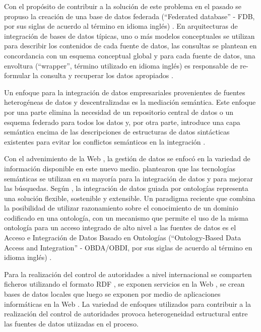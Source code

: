 Con el propósito de contribuir a la solución de este problema en el pasado se propuso la creación de una base de datos federada (``Federated database'' - FDB, por sus siglas de acuerdo al término en idioma inglés) \citep{Sheth1990}. En arquitecturas de integración de bases de datos típicas, uno o más modelos conceptuales se utilizan para describir los contenidos de cada fuente de datos, las consultas se plantean en concordancia con un esquema conceptual global y para cada fuente de datos, una envoltura (``wrapper'', término utilizado en idioma inglés) es responsable de re-formular la consulta y recuperar los datos apropiados \citep{Spanos2012,Franke2014,ElKadiri2015}.

Un enfoque para la integración de datos empresariales provenientes de fuentes heterogéneas de datos y descentralizadas es la mediación semántica. Este enfoque por una parte elimina la necesidad de un repositorio central de datos o un esquema federado para todos los datos y, por otra parte, introduce una capa semántica encima de las descripciones de estructuras de datos sintácticas existentes para evitar los conflictos semánticos en la integración \citep{ElKadiri2015}. 

Con el advenimiento de la Web \citep{berners1990worldwideweb}, la gestión de datos se enfocó en la variedad de información disponible en este nuevo medio. \cite{Janev2011} plantearon que las tecnologías semánticas se utilizan en su mayoría para la integración de datos y para mejorar las búsquedas. Según \citep{Hoang2014}, la integración de datos guiada por ontologías representa una solución flexible, sostenible y extensible. Un paradigma reciente que combina la posibilidad de utilizar razonamiento sobre el conocimiento de un dominio codificado en una ontología, con un mecanismo que permite el uso de la misma ontología para un acceso integrado de alto nivel a las fuentes de datos es el Acceso e Integración de Datos Basado en Ontologías (``Ontology-Based Data Access and Integration'' - OBDA/OBDI, por sus siglas de acuerdo al término en idioma inglés) \citep{Calvanese2016,Calvanese2017}.

Para la realización del control de autoridades a nivel internacional se comparten ficheros utilizando el formato RDF \citep{Sandberg2016}, se exponen servicios en la Web \citep{ORCID2017}, se crean bases de datos locales que luego se exponen por medio de aplicaciones informáticas en la Web \citep{OCLCOnlineComputerLibraryCenterInc.2014}. La variedad de enfoques utilizados para contribuir a la realización del control de autoridades provoca heterogeneidad estructural entre las fuentes de datos utiizadas en el proceso.

